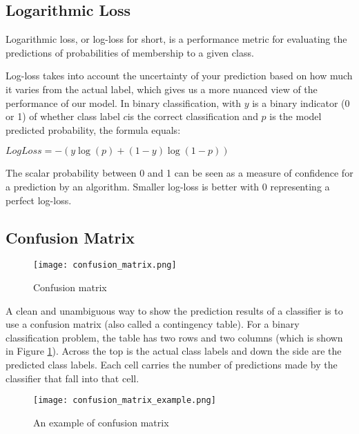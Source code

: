 \subsection{Logarithmic Loss}

Logarithmic loss, or log-loss for short, is a performance metric for evaluating the predictions of probabilities of membership to a given class.

Log-loss takes into account the uncertainty of your prediction based on how much it varies from the actual label, which gives us a more nuanced view of the performance of our model.
In binary classification, with $y$ is a binary indicator (0 or 1) of whether class label $c $is the correct classification and $p$ is the model predicted probability, the formula equals:

\bigskip
\begin{center}
    $LogLoss = -(y\log(p) + (1 - y)\log(1 - p))$
\end{center}
\bigskip

The scalar probability between 0 and 1 can be seen as a measure of confidence for a prediction by an algorithm.
Smaller log-loss is better with 0 representing a perfect log-loss.

\subsection{Confusion Matrix}
\label{ssec:confusion_matrix}

\begin{figure}[H]
    \centering    
    \texttt{[image: confusion\_matrix.png]}
    \caption{Confusion matrix \cite{wiki_confusion_matrix}}
    \label{fig:confusion_matrix}
\end{figure}

A clean and unambiguous way to show the prediction results of a classifier is to use a confusion matrix (also called a contingency table).
For a binary classification problem, the table has two rows and two columns (which is shown in Figure \ref{fig:confusion_matrix}). 
Across the top is the actual class labels and down the side are the predicted class labels. 
Each cell carries the number of predictions made by the classifier that fall into that cell.

\begin{figure}[H]
    \centering    
    \texttt{[image: confusion\_matrix\_example.png]}
    \caption{An example of confusion matrix}
    \label{fig:confusion_matrix_example}
\end{figure}

